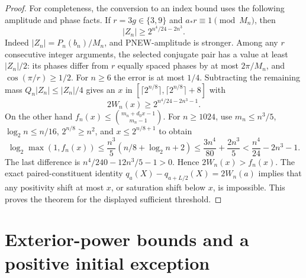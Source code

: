 \begin{proof}
For completeness, the conversion to an index bound uses the
following amplitude and phase facts.  If $r=3g\in\{3,9\}$ and
$a_*r\equiv1\pmod{M_n}$, then
\[
 |Z_n|\ge2^{n^4/24-2n^3}.
\]
Indeed $|Z_n|=P_n(b_n)/M_n$, and PNEW-amplitude is stronger.
Among any $r$ consecutive integer arguments, the selected
conjugate pair has a value at least $|Z_n|/2$: its phases differ
from $r$ equally spaced phases by at most $2\pi/M_n$, and
$\cos(\pi/r)\ge1/2$.  For $n\ge6$ the error is at most
$1/4$.  Subtracting the remaining mass $Q_n|Z_n|\le|Z_n|/4$
gives an $x$ in
$[\lceil2^{n/8}\rceil,\lceil2^{n/8}\rceil+8]$ with
\[
                    2W_n(x)\ge2^{n^4/24-2n^3-1}.
\]
On the other hand
$f_n(x)\le\binom{m_n+d_0x-1}{m_n-1}$.
For $n\ge1024$, use $m_n\le n^3/5$,
$\log_2n\le n/16$, $2^{n/8}\ge n^2$, and
$x\le2^{n/8+1}$ to obtain
\[
 \log_2\max(1,f_n(x))
 \le\frac{n^3}{5}(n/8+\log_2n+2)
 \le\frac{3n^4}{80}+\frac{2n^3}{5}
                  <\frac{n^4}{24}-2n^3-1.
\]
The last difference is $n^4/240-12n^3/5-1>0$.
Hence $2W_n(x)>f_n(x)$.  The exact paired-constituent identity
$q_a(X)-q_{a+L/2}(X)=2W_n(a)$ implies that any positivity shift
at most $x$, or saturation shift below $x$, is impossible.
This proves the theorem for the displayed sufficient threshold.
\end{proof}


\section{Exterior-power bounds and a positive initial exception}
\label{sec:exterior-witnesses}

